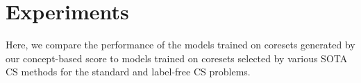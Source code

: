 \section{Experiments}
\label{sec:experiments}
Here, we compare the performance of the models trained on coresets generated by our concept-based score to models trained on coresets selected by various SOTA CS methods for the standard and label-free CS problems. 

   

